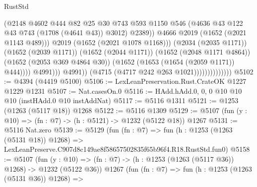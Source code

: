 \begin{lexlean}{RustStd}
\begin{coremodule}
                                                (@2148
                                                  @4602
                                                  @444
                                                  @82
                                                  @25
                                                  @30
                                                  @743
                                                  @593
                                                  @1150
                                                  @546
                                                  (@4636
                                                    @43
                                                    @122
                                                    @43
                                                    @743
                                                    (@1708 (@4641 @43))
                                                    @3012)
                                                  @2389))
                                              @4666
                                              @2019
                                              (@1652 (@2021 @1143 @489)))
                                            @2019
                                            (@1652 (@2021 @1078 @1168)))
                                          (@2034 (@2035 @1171))
                                          (@1652 (@2039 @1171))
                                          (@1652 (@2044 @1171))
                                          (@1652 (@2048 @1171 @4864))
                                          (@1652 (@2053 @369 @4864 @30))
                                          (@1652 (@1653 (@1654 (@2059 @1171)) @444))))
                                      @4991)))
                                @4991))
                            (@4715 (@4717 @242 @263 @1021))))))))))))))
@5102 := @4394 (@4419 @5100)
@5106 := LexLeanPreservation.Rust.CrateOK @1227 @1229 @1231
@5107 := Nat.casesOn.{0}
@5116 := HAdd.hAdd.{0, 0, 0} @10 @10 @10 (instHAdd.{0} @10 instAddNat)
@5117 := @5116 @1311
@5121 := @1253 (@1263 (@5117 @18)) @1268
@5122 := @5116 @1309
@5129 := @5107 (fun (y : @10) => (fn : @7) -> (h : @5121) -> @1232 (@5122 @18)) @1267
@5131 := @5116 Nat.zero
@5139 := @5129
    (fun (fn : @7) =>
    fun (h : @1253 (@1263 (@5131 @18)) @1268) =>
    LexLeanPreserve.C907d8c149ae8f58657502835f65b96f4.R18.RustStd.fun0)
@5158 := @5107
    (fun (y : @10) => (fn : @7) -> (h : @1253 (@1263 (@5117 @36)) @1268) -> @1232 (@5122 @36))
    @1267
    (fun (fn : @7) =>
    fun (h : @1253 (@1263 (@5131 @36)) @1268) =>

\end{coremodule}
\end{lexlean}
